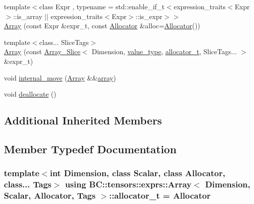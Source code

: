\begin{DoxyCompactItemize}
\item 
{\footnotesize template$<$class Expr , typename  = std\+::enable\+\_\+if\+\_\+t$<$expression\+\_\+traits$<$\+Expr$>$\+::is\+\_\+array $\vert$$\vert$ expression\+\_\+traits$<$\+Expr$>$\+::is\+\_\+expr$>$$>$ }\\\hyperlink{classBC_1_1tensors_1_1exprs_1_1Array_aec33818cfb1f18127c3ad3fbdecc9d1f}{Array} (const Expr \&expr\+\_\+t, const \hyperlink{namespaceBC_a934f94b17b06290e6b241e5f59930c5f}{Allocator} \&alloc=\hyperlink{namespaceBC_a934f94b17b06290e6b241e5f59930c5f}{Allocator}())
\item 
{\footnotesize template$<$class... Slice\+Tags$>$ }\\\hyperlink{classBC_1_1tensors_1_1exprs_1_1Array_a03dbce4acf0a8db4466a56d5223512a9}{Array} (const \hyperlink{classBC_1_1tensors_1_1exprs_1_1Array__Slice}{Array\+\_\+\+Slice}$<$ Dimension, \hyperlink{structBC_1_1allocators_1_1Host_a0663f90f62e2b8c223a4402bef3d87e5}{value\+\_\+type}, \hyperlink{classBC_1_1tensors_1_1exprs_1_1Array_a030984df764670f7624708e41b1f0107}{allocator\+\_\+t}, Slice\+Tags... $>$ \&expr\+\_\+t)
\item 
void \hyperlink{classBC_1_1tensors_1_1exprs_1_1Array_a06f6f5b3eef9ef7e99a4fbc8c5943add}{internal\+\_\+move} (\hyperlink{classBC_1_1tensors_1_1exprs_1_1Array}{Array} \&\&\hyperlink{structBC_1_1array}{array})
\item 
void \hyperlink{classBC_1_1tensors_1_1exprs_1_1Array_a81c124e95d0bcae0661d4c61fa71338e}{deallocate} ()
\end{DoxyCompactItemize}
\subsection*{Additional Inherited Members}


\subsection{Member Typedef Documentation}
\subsubsection[{\texorpdfstring{allocator\+\_\+t}{allocator_t}}]{\setlength{\rightskip}{0pt plus 5cm}template$<$int Dimension, class Scalar, class Allocator, class... Tags$>$ using {\bf B\+C\+::tensors\+::exprs\+::\+Array}$<$ Dimension, {\bf Scalar}, {\bf Allocator}, Tags $>$\+::{\bf allocator\+\_\+t} =  {\bf Allocator}}\hypertarget{classBC_1_1tensors_1_1exprs_1_1Array_a030984df764670f7624708e41b1f0107}{}\label{classBC_1_1tensors_1_1exprs_1_1Array_a030984df764670f7624708e41b1f0107}
